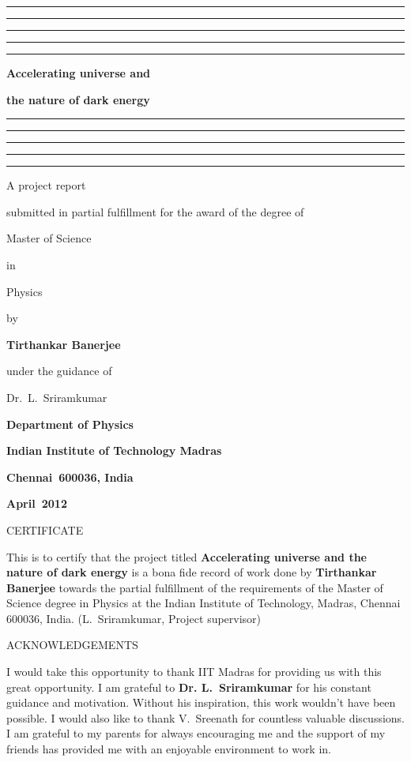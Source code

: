 \documentclass[12pt,a4paper,oneside]{book}
\begin{document}

\baselineskip 20pt




\thispagestyle{empty}
\topskip 15pt
\hrule\hrule\hrule\hrule\hrule
\vskip 20pt
\centerline{\Huge \bf Accelerating universe and} 
\vskip 15pt
\centerline{\Huge \bf the nature of dark energy} 
\vskip 20pt
\hrule\hrule\hrule\hrule\hrule
\vskip 30pt
\centerline{\Large A project report}
\vskip 8pt
\centerline{\Large submitted in partial fulfillment 
for the award of the degree of}
\vskip 8pt
\centerline{\Large Master of Science}
\vskip 8pt
\centerline{\Large in}
\vskip 8pt 
\centerline{\Large Physics}
\vskip 8pt
\centerline{\Large by}
\vskip 8pt
\centerline{\Large \bf Tirthankar Banerjee}
\vskip 8pt
\centerline{\Large under the guidance of}
\vskip 8pt
\centerline{\Large  Dr.~L.~Sriramkumar}
\vskip 30pt 
\begin{center}
\end{center}
\vskip 8pt 
\centerline{\Large \bf Department of Physics}
\vskip 8pt 
\centerline{\Large \bf Indian Institute of Technology Madras}
\vskip 8pt 
\centerline{\Large \bf Chennai~600036, India}
\vskip 8pt
\centerline{\Large \bf April~2012}

\newpage\topskip 40pt
\centerline{\Large CERTIFICATE}
\thispagestyle{empty}
\vskip 20pt\noindent 
This is to certify that the project titled {\bf Accelerating universe
and the nature of dark energy} is a bona fide record of work done by 
{\bf Tirthankar Banerjee} towards the partial fulfillment of the 
requirements of the Master of Science degree in Physics at the Indian 
Institute of Technology, Madras, Chennai 600036, India.
\vskip 120pt
\hspace{240pt}(L.~Sriramkumar, Project supervisor)


\newpage\topskip 40pt
\thispagestyle{empty}
\centerline{\Large ACKNOWLEDGEMENTS}
\vskip 20pt\noindent 
I would take this opportunity to thank IIT Madras for providing us with this
great opportunity. I am grateful to {\bf Dr. L.~Sriramkumar} for his constant
guidance and motivation. Without his inspiration, this work wouldn't have been
possible. I would also like to thank V.~Sreenath for countless valuable
discussions. 
I am grateful to my parents for always encouraging me and the support of my
friends has provided me with an enjoyable environment to work in.
\end{document}
